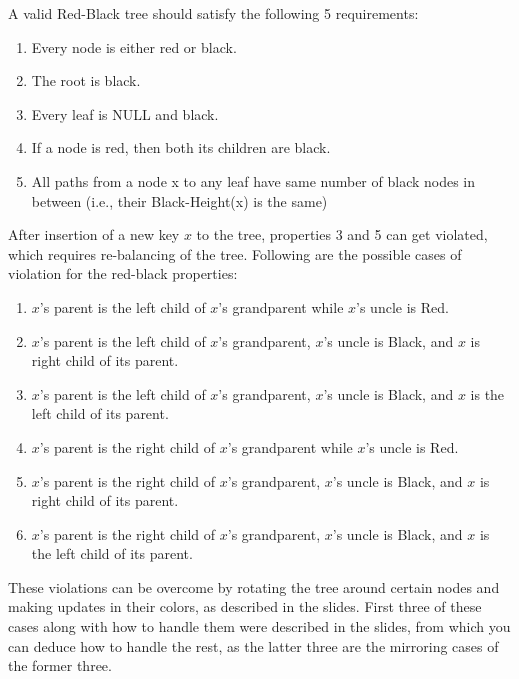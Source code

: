 \documentclass[answers,addpoints,11pt]{exam}
\begin{document}
\begin{questions}
A valid Red-Black tree should satisfy the following 5 requirements:
\begin{enumerate}
    \item Every node is either red or black.
    \item The root is black.
    \item Every leaf is NULL and black.
    \item If a node is red, then both its children are black. 
    \item All paths from a node x to any leaf have same number of black nodes in between (i.e., their Black-Height(x) is the same)
\end{enumerate}
After insertion of a new key $x$ to the tree, properties 3 and 5 can get violated, which requires re-balancing of the tree. Following are the possible cases of violation for the red-black properties:\\
\begin{enumerate}
    \item $x$’s parent is the left child of $x$’s grandparent while $x$’s uncle is Red.
    \item $x$’s parent is the left child of $x$’s grandparent, $x$’s uncle is Black, and $x$ is right child of its parent.
    \item $x$’s parent is the left child of $x$’s grandparent, $x$’s uncle is Black, and $x$ is the left child of its parent.
    \item $x$’s parent is the right child of $x$’s grandparent while $x$’s uncle is Red.
    \item $x$’s parent is the right child of $x$’s grandparent, $x$’s uncle is Black, and $x$ is right child of its parent.
    \item $x$’s parent is the right child of $x$’s grandparent, $x$’s uncle is Black, and $x$ is the left child of its parent.
\end{enumerate}
These violations can be overcome by rotating the tree around certain nodes and making updates in their colors, as described in the slides. First three of these cases along with how to handle them were described in the slides, from which you can deduce how to handle the rest, as the latter three are the mirroring cases of the former three.


\end{questions}
\end{document}
